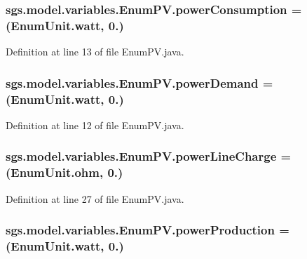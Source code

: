 \subsubsection[{power\-Consumption}]{\setlength{\rightskip}{0pt plus 5cm}sgs.\-model.\-variables.\-Enum\-P\-V.\-power\-Consumption =({\bf Enum\-Unit.\-watt}, 0.)}\label{enumsgs_1_1model_1_1variables_1_1_enum_p_v_a3b0673fad3f4fa68161454af3436a388}


Definition at line 13 of file Enum\-P\-V.\-java.

\subsubsection[{power\-Demand}]{\setlength{\rightskip}{0pt plus 5cm}sgs.\-model.\-variables.\-Enum\-P\-V.\-power\-Demand =({\bf Enum\-Unit.\-watt}, 0.)}\label{enumsgs_1_1model_1_1variables_1_1_enum_p_v_a1670fe5188c6f53894693fc9f3d4ffaf}


Definition at line 12 of file Enum\-P\-V.\-java.

\subsubsection[{power\-Line\-Charge}]{\setlength{\rightskip}{0pt plus 5cm}sgs.\-model.\-variables.\-Enum\-P\-V.\-power\-Line\-Charge =({\bf Enum\-Unit.\-ohm}, 0.)}\label{enumsgs_1_1model_1_1variables_1_1_enum_p_v_aff29d336415fe823afafcd863bb8e86a}


Definition at line 27 of file Enum\-P\-V.\-java.

\subsubsection[{power\-Production}]{\setlength{\rightskip}{0pt plus 5cm}sgs.\-model.\-variables.\-Enum\-P\-V.\-power\-Production =({\bf Enum\-Unit.\-watt}, 0.)}\label{enumsgs_1_1model_1_1variables_1_1_enum_p_v_aae5cf699517401de93ade9f75719acd4}


